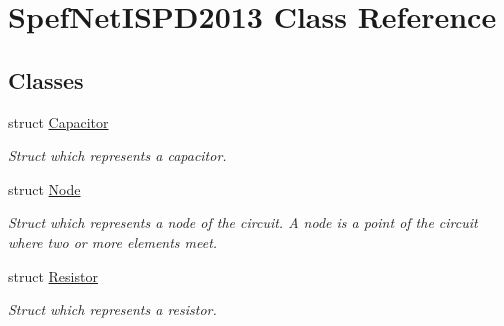 \hypertarget{classSpefNetISPD2013}{\section{Spef\-Net\-I\-S\-P\-D2013 Class Reference}
\label{classSpefNetISPD2013}
}
\subsection*{Classes}
\begin{DoxyCompactItemize}
\item 
struct \hyperlink{structSpefNetISPD2013_1_1Capacitor}{Capacitor}
\begin{DoxyCompactList}\small\item\em Struct which represents a capacitor. \end{DoxyCompactList}\item 
struct \hyperlink{structSpefNetISPD2013_1_1Node}{Node}
\begin{DoxyCompactList}\small\item\em Struct which represents a node of the circuit. A node is a point of the circuit where two or more elements meet. \end{DoxyCompactList}\item 
struct \hyperlink{structSpefNetISPD2013_1_1Resistor}{Resistor}
\begin{DoxyCompactList}\small\item\em Struct which represents a resistor. \end{DoxyCompactList}\end{DoxyCompactItemize}
